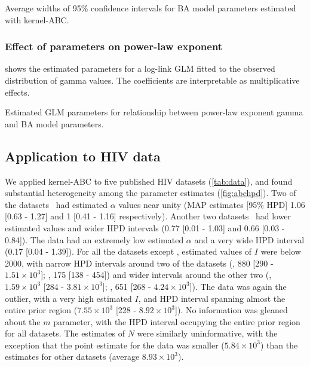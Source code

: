 \begin{table}
    \centering
    
    \caption{Average widths of 95\% confidence intervals for \gls{BA} model
    parameters estimated with kernel-\gls{ABC}.}
    \label{tab:glm}
\end{table}

\subsubsection*{Effect of parameters on power-law exponent}

 shows the estimated parameters for a log-link \gls{GLM} fitted
to the observed distribution of \gls{gamma} values. The coefficients are
interpretable as multiplicative effects.

\begin{table}
    \centering
    
    \caption{Estimated \gls{GLM} parameters for relationship between power-law
    exponent \gls{gamma} and \gls{BA} model parameters.}
    \label{tab:glm}
\end{table}

\subsection{Application to HIV data}



We applied kernel-ABC to five published HIV datasets (\cref{tab:data}),
and found substantial heterogeneity among the parameter estimates
(\cref{fig:abchpd}). Two of the datasets~\autocite{niculescu2015recent,
wang2015targeting} had estimated $\alpha$ values near unity (MAP estimates
[95\% HPD] 
  1.06 
  [0.63 - 
   1.27]
and
  1 
  [0.41 -
   1.16] respectively). 
Another two datasets~\autocite{li2015hiv, cuevas2009hiv} had lower estimated
values and wider HPD intervals
  (0.77 
  [0.01 - 
  1.03]
and
  0.66 
  [0.03 -
   0.84]). 
The \textcite{novitsky2014impact} data had an extremely low estimated $\alpha$
and a very wide HPD interval
  (0.17 
  [0.04 -
   1.39]). 
For all the datasets except \citeauthor{novitsky2014impact}, estimated values of
$I$ were below 2000, with narrow HPD intervals around two of the
datasets
  (\citeauthor{cuevas2009hiv}, 880 
  [290 -
   \ensuremath{1.51\times 10^{3}}];
   \citeauthor{niculescu2015recent}, 175
  [138 - 
   454])
and wider intervals around the other two
  (\citeauthor{li2015hiv}, \ensuremath{1.59\times 10^{3}} 
  [284 -
   \ensuremath{3.81\times 10^{3}}];
   \citeauthor{wang2015targeting}, 651
  [268 - 
   \ensuremath{4.24\times 10^{3}}]).
The \citeauthor{novitsky2014impact} data was again the outlier, with a very high
estimated $I$, and HPD interval spanning almost the entire prior region
  (\ensuremath{7.55\times 10^{3}} 
  [228 -
   \ensuremath{8.92\times 10^{3}}]).
No information was gleaned about the $m$ parameter, with the HPD interval
occupying the entire prior region for all datasets. The estimates of $N$ were
similarly uninformative, with the exception that the point estimate for the
\citeauthor{wang2015targeting} data was smaller
  (\ensuremath{5.84\times 10^{3}})
than the estimates for other datasets
 (average \ensuremath{8.93\times 10^{3}}).

